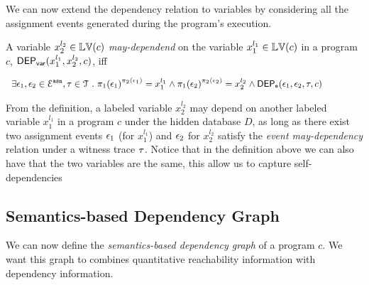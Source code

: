 {
  We can now extend the dependency relation to variables by considering all the assignment events generated during the program’s execution. 
}
\begin{defn}
  \label{def:var_dep}
A variable ${x}_2^{l_2} \in \mathbb{LV}(c)$  \emph{may-dependend} on the 
  variable ${x}_1^{l_1} \in \mathbb{LV}(c)$ in a program ${c}$,
  $\mathsf{DEP_{var}}({x}_1^{l_1}, {x}_2^{l_2}, {c})$, iff
\begin{center}
$
{\small   \begin{array}{l}
\exists \event_1, \event_2 \in \eventset^{\asn}, \trace \in \mathcal{T} \st
\pi_{1}{(\event_1)}^{\pi_{2}{(\event_1)}} = {x}_1^{l_1}
\land
\pi_{1}{(\event_2)}^{\pi_{2}{(\event_2)}} = {x}_2^{l_2}%
\land 
\eventdep(\event_1, \event_2, \trace, c) 
  \end{array}
}%
$
\end{center}
  \end{defn}
{From the definition, a labeled variable $x_2^{l_2}$ may depend on another labeled variable $x_1^{l_1}$ in a program $c$ under the hidden database $D$, 
as long as there exist two assignment events $\mathtt{\epsilon}_1$ (for $x_1^{l_1}$) and $\mathtt{\epsilon}_2$ for $x_2^{l_2}$
satisfy the \emph{event may-dependency} relation under a witness trace $\mathtt{\tau}$.  
Notice that in the definition above we can also have that the two variables are the same,
this allow us to capture self-dependencies
}



\subsection{Semantics-based Dependency Graph}
\label{sec:design_choice}
We can now define the \emph{semantics-based dependency graph} of a program $c$. We want this graph to combines quantitative reachability information with dependency information. 

